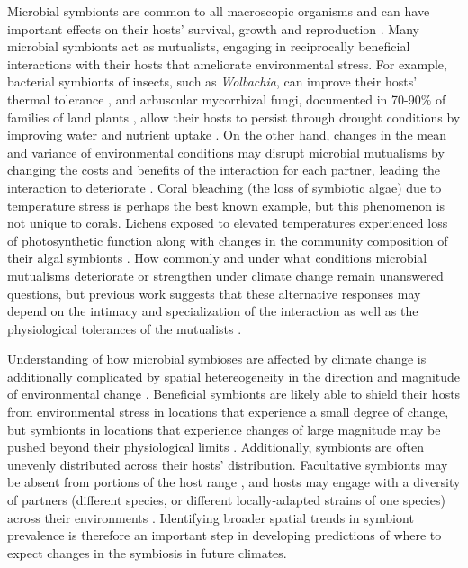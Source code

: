 \documentclass[11pt]{article}
\let\cite\citep
\begin{document}
Microbial symbionts are common to all macroscopic organisms and can have important effects on their hosts' survival, growth and reproduction \cite{rodriguez2009fungal,mcfall2013animals}.
Many microbial symbionts act as mutualists, engaging in reciprocally beneficial interactions with their hosts that ameliorate environmental stress. 
For example, bacterial symbionts of insects, such as \emph{Wolbachia}, can improve their hosts' thermal tolerance \citep{truitt2019wolbachia, renoz2019evolutionary}, and arbuscular mycorrhizal fungi, documented in 70-90\% of families of land plants \citep{parniske2008arbuscular}, allow their hosts to persist through drought conditions by improving water and nutrient uptake \citep{cheng2021elucidating}.
On the other hand, changes in the mean and variance of environmental conditions may disrupt microbial  mutualisms by changing the costs and benefits of the interaction for each partner, leading the interaction to deteriorate \citep{aslan2013mutualism}. 
Coral bleaching (the loss of symbiotic algae) due to temperature stress \citep{sully2019global} is perhaps the best known example, but this phenomenon is not unique to corals.
Lichens exposed to elevated temperatures experienced loss of photosynthetic function along with changes in the community composition of their algal symbionts \citep{meyer2022climate}.
How commonly and under what conditions microbial mutualisms deteriorate or strengthen under climate change remain unanswered questions, but previous work suggests that these alternative responses may depend on the intimacy and specialization of the interaction as well as the physiological tolerances of the mutualists \citep{toby2010mutualisms, warren2014mutualism, rafferty2015phenological}. 

Understanding of how microbial symbioses are affected by climate change is additionally complicated by spatial hetereogeneity in the direction and magnitude of environmental change \cite{ipcc_2021}. 
Beneficial symbionts are likely able to shield their hosts from environmental stress in locations that experience a small degree of change, but symbionts in locations that experience changes of large magnitude may be pushed beyond their physiological limits \cite{webster2008temperature}.
Additionally, symbionts are often unevenly distributed across their hosts' distribution.
Facultative symbionts may be absent from portions of the host range \cite{afkhami2014mutualist}, and hosts may engage with a diversity of partners (different species, or different locally-adapted strains of one species) across their environments \cite{frade2008variation, rolshausen2018quantifying}.
Identifying broader spatial trends in symbiont prevalence is therefore an important step in developing predictions of where to expect changes in the symbiosis in future climates.
\end{document}
